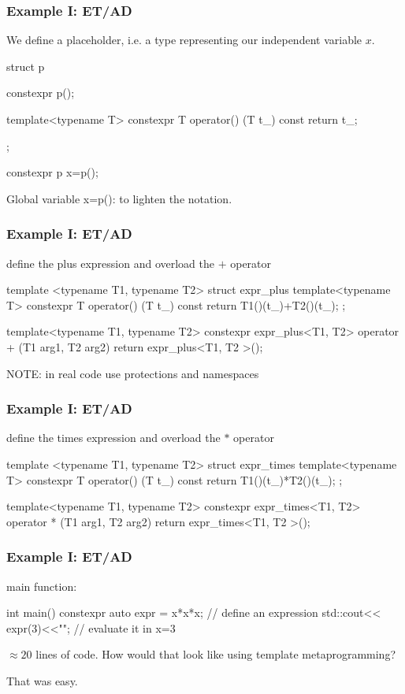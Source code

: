 \documentclass[aspectratio=43]{beamer}
\begin{document}
\begin{frame}[fragile]\frametitle{Example I: ET/AD}
  We define a placeholder, i.e. a type representing our independent variable $x$.
\begin{Cpplisting}[: p.cpp]{}
struct p{
  constexpr p(){};

  template<typename T>
  constexpr T operator() (T t_) const {
    return t_;
  }
};

constexpr p x=p();
\end{Cpplisting}
Global variable x=p(): to lighten the notation.
\end{frame}


\begin{frame}[fragile]\frametitle{Example I: ET/AD}
  define the plus expression and overload the $+$ operator
\begin{Cpplisting}{}
template <typename T1, typename T2>
struct expr_plus{
  template<typename T>
  constexpr T operator() (T t_) const{
    return T1()(t_)+T2()(t_);
  }
};

template<typename T1, typename T2>
constexpr expr_plus<T1, T2>
operator + (T1 arg1, T2 arg2){
  return expr_plus<T1, T2 >();}
\end{Cpplisting}
NOTE: in real code use protections and namespaces
\end{frame}

\begin{frame}[fragile]\frametitle{Example I: ET/AD}
  define the times expression and overload the $*$ operator
\begin{Cpplisting}{}
template <typename T1, typename T2>
struct expr_times{
  template<typename T>
  constexpr T operator() (T t_) const{
    return T1()(t_)*T2()(t_);
  }
};

template<typename T1, typename T2>
constexpr expr_times<T1, T2>
operator * (T1 arg1, T2 arg2){
  return expr_times<T1, T2 >();}
\end{Cpplisting}
\end{frame}

\begin{frame}[fragile]\frametitle{Example I: ET/AD}
  main function:
  \begin{Cpplisting}[: main]{}
int main(){
  constexpr auto expr = x*x*x; // define an expression
  std::cout<< expr(3)<<"\n"; // evaluate it in x=3
}
  \end{Cpplisting}
  $\approx20$ lines of code. How would that look like using template metaprogramming?

  That was easy.
\end{frame}
\end{document}

